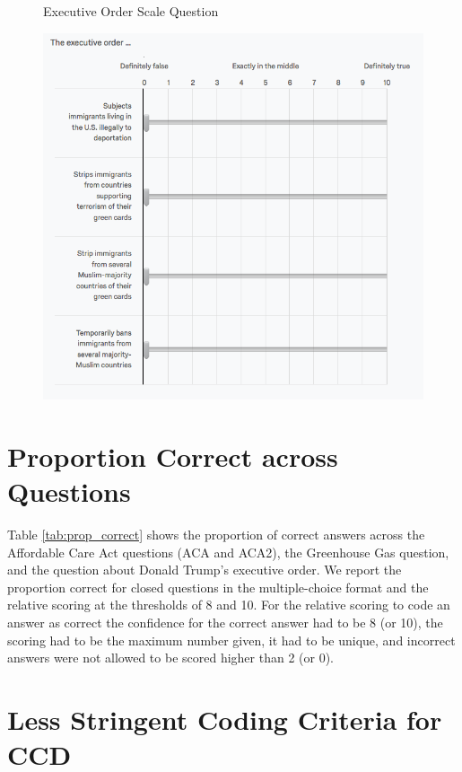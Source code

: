 \begin{center}
	\begin{figure}[H]
		\centering
		\caption{Executive Order Scale Question}
		\includegraphics[width=\textwidth]{../figs/hk_eo1.png}
		\label{fig:eo1}
		\caption*{\footnotesize }
	\end{figure}
\end{center}

\clearpage
\section{Proportion Correct across Questions}

Table \ref{tab:prop_correct} shows the proportion of correct answers across the Affordable Care Act questions (ACA and ACA2), the Greenhouse Gas question, and the question about Donald Trump's executive order. We report the proportion correct for closed questions in the multiple-choice format and the relative scoring at the thresholds of 8 and 10. For the relative scoring to code an answer as correct the confidence for the correct answer had to be 8 (or 10), the scoring had to be the maximum number given, it had to be unique, and incorrect answers were not allowed to be scored higher than 2 (or 0). 



\clearpage
\section{Less Stringent Coding Criteria for CCD}
\label{si_alternate_coding}


